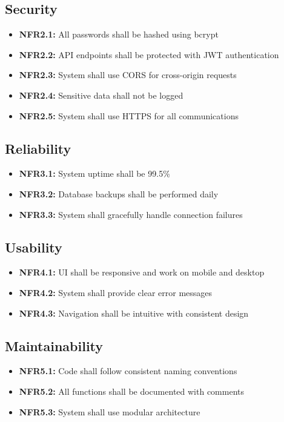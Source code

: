 \documentclass[12pt,a4paper]{report}
\begin{document}
\subsection{Security}
\begin{itemize}
    \item \textbf{NFR2.1:} All passwords shall be hashed using bcrypt
    \item \textbf{NFR2.2:} API endpoints shall be protected with JWT authentication
    \item \textbf{NFR2.3:} System shall use CORS for cross-origin requests
    \item \textbf{NFR2.4:} Sensitive data shall not be logged
    \item \textbf{NFR2.5:} System shall use HTTPS for all communications
\end{itemize}

\subsection{Reliability}
\begin{itemize}
    \item \textbf{NFR3.1:} System uptime shall be 99.5\%
    \item \textbf{NFR3.2:} Database backups shall be performed daily
    \item \textbf{NFR3.3:} System shall gracefully handle connection failures
\end{itemize}

\subsection{Usability}
\begin{itemize}
    \item \textbf{NFR4.1:} UI shall be responsive and work on mobile and desktop
    \item \textbf{NFR4.2:} System shall provide clear error messages
    \item \textbf{NFR4.3:} Navigation shall be intuitive with consistent design
\end{itemize}

\subsection{Maintainability}
\begin{itemize}
    \item \textbf{NFR5.1:} Code shall follow consistent naming conventions
    \item \textbf{NFR5.2:} All functions shall be documented with comments
    \item \textbf{NFR5.3:} System shall use modular architecture
\end{itemize}
\end{document}
